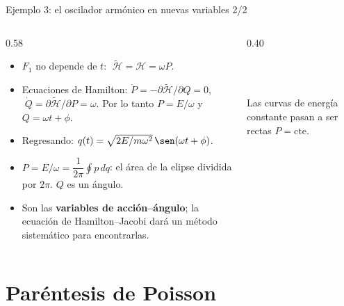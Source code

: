 \documentclass[spanish]{beamer}
\newcommand{\Ham}{\mathcal{H}}               %
\newcommand{\tH}{\tilde{\mathcal{H}}}        %
\newcommand{\cte}{\text{cte}}
\begin{document}
\begin{frame}{Ejemplo 3: el oscilador armónico en nuevas variables 2/2}
\begin{columns}[T]
\begin{column}{0.58\textwidth}
\begin{itemize}[<+->]
  \item $F_1$ no depende de $t$: $\;\tH=\Ham=\omega P$.
  \item Ecuaciones de Hamilton:
        $\dot P=-\partial\tH/\partial Q=0$, $\;\dot Q=\partial\tH/\partial P=\omega$.
        Por lo tanto $P=E/\omega$ y $Q=\omega t+\phi$.
  \item Regresando:
        $q(t)=\sqrt{2E/m\omega^2}\,\sen(\omega t+\phi)$.
  \item $P=E/\omega=\dfrac{1}{2\pi}\oint p\,dq$: el área de la elipse dividida por
        $2\pi$. $Q$ es un ángulo.
  \item Son las \textbf{variables de acción--ángulo}; la ecuación de
        Hamilton--Jacobi dará un método sistemático para encontrarlas.
\end{itemize}
\end{column}
\begin{column}{0.40\textwidth}
\centering
\\[1mm]
\\
{\tiny Las curvas de energía constante pasan a ser rectas $P=\cte$.}
\end{column}
\end{columns}
\end{frame}

\section{Paréntesis de Poisson}
\end{document}
